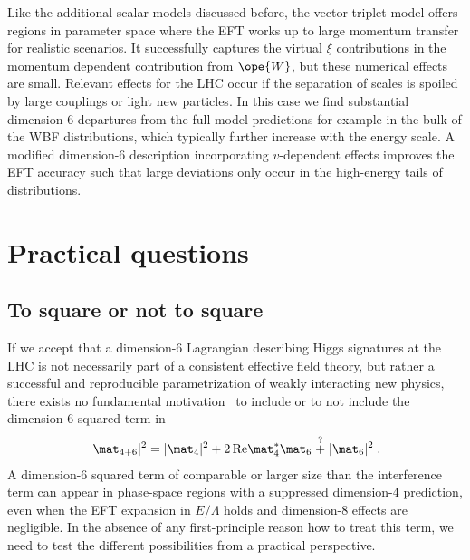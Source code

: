 Like the additional scalar models discussed before, the vector triplet
model offers regions in parameter space where the EFT works up to
large momentum transfer for realistic scenarios. It successfully
captures the virtual $\xi$ contributions in the momentum dependent
contribution from $\ope{W}$, but these numerical effects are small.
Relevant effects for the LHC occur if the separation of scales is
spoiled by large couplings or light new particles. In this case we
find substantial dimension-6 departures from the full model
predictions for example in the bulk of the WBF distributions, which
typically further increase with the energy scale.  A modified
dimension-6 description incorporating $v$-dependent effects improves
the EFT accuracy such that large deviations only occur in the
high-energy tails of distributions.




\section{Practical questions}
\label{sec:validity_practical_questions}




\subsection{To square or not to square}

If we accept that a dimension-6 Lagrangian describing Higgs signatures
at the LHC is not necessarily part of a consistent effective field
theory, but rather a successful and reproducible parametrization of
weakly interacting new physics, there exists no fundamental
motivation~\cite{legacy,too_long,mvh,gino,spanno} to include or to not
include the dimension-6 squared term in
%
\begin{align}
|\mat_{4+6}|^2 = |\mat_4|^2 + 2 \, \text{Re} \mat_4^* \mat_6 \stackrel{?}{+} |\mat_6|^2 \; .
\end{align}
%
A dimension-6 squared term of comparable or larger size than
the interference term can appear in phase-space regions with
a suppressed dimension-4 prediction, even when the EFT expansion in
$E/\Lambda$ holds and dimension-8 effects are negligible.
In the absence of any first-principle reason how to treat this term,
we need to test the different possibilities from a practical
perspective.


